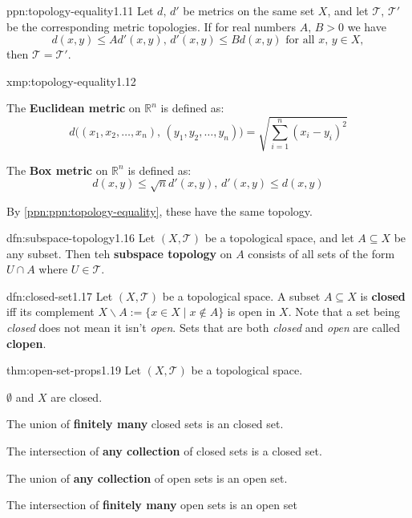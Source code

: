 \documentclass[landscape, 8pt]{extarticle}
\begin{document}
\begin{multicols}{3}
\begin{ppn}{ppn:topology-equality}{1.11}
    Let $d,\,d'$ be metrics on the same set $X$, and let $\mathcal{T},\,\mathcal{T}'$ be the corresponding metric topologies. If for real numbers $A,\, B > 0$ we have
    \[d(x, y) \le Ad'(x, y),\, d'(x, y) \le Bd(x, y) \text{ for all } x,\,y\in X,\]
    then $\mathcal{T} = \mathcal{T}'$.
\end{ppn}

\begin{xmp}{xmp:topology-equality}{1.12}
    \begin{itemize-tight}
        \item The \textbf{Euclidean metric} on $\mathbb{R}^{n}$ is defined as:
            \[d\bigl((x_{1},x_{2},\dots,x_{n}),\, (y_{1},y_{2},\dots,y_{n})\bigr) = \sqrt{\sum_{i = 1}^{n}(x_{i} - y_{i})^{2}}\]
        \item The \textbf{Box metric} on $\mathbb{R}^{n}$ is defined as:
            \[d(x, y) \le \sqrt{n} d'(x,y),\, d'(x,y) \le d(x, y)\]
    \end{itemize-tight}
    By \ref{ppn:ppn:topology-equality}, these have the same topology.
\end{xmp}

\begin{dfn}{dfn:subspace-topology}{1.16}
    Let $(X, \mathcal{T})$ be a topological space, and let $A \subseteq X$ be any subset. Then teh \textbf{subspace topology} on $A$ consists of all sets of the form $U \cap A$ where $U \in \mathcal{T}$.
\end{dfn}

\begin{dfn}{dfn:closed-set}{1.17}
    Let $(X, \mathcal{T})$ be a topological space. A subset $A \subseteq X$ is \textbf{closed} iff its complement $X \backslash A := \{x \in X \mid x \not\in A\}$ is open in $X$. Note that a set being \textit{closed} does not mean it isn't \textit{open}. Sets that are both \textit{closed} and \textit{open} are called \textbf{clopen}.
\end{dfn}

\begin{thm}{thm:open-set-props}{1.19}
    \vspace{-5pt}
    Let $(X,\mathcal{T})$ be a topological space.
    \vspace{-5pt}
    \begin{enumerate-zero}
        \item $\emptyset$ and $X$ are closed.
        \item The union of \textbf{finitely many} closed sets is an closed set.
        \item The intersection of \textbf{any collection} of closed sets is a closed set.
        \item The union of \textbf{any collection} of open sets is an open set.
        \item The intersection of \textbf{finitely many} open sets is an open set
\end{enumerate-zero}
\end{thm}


\end{multicols}
\end{document}
